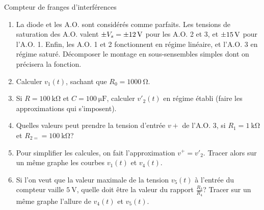 \documentclass[french, a4paper, 11pt]{article}
\begin{document}
\begin{cadre}{Compteur de franges d'interférences}
  \begin{enumerate}[label=\upshape\alph*)]
    \item La diode et les A.O. sont considérés comme parfaits. Les tensions de saturation des A.O. valent \(\pm V_{s} = \SI{\pm 12}{\volt}\) pour les A.O. 2 et 3, et \(\SI{\pm 15}{\volt}\) pour l'A.O. 1. Enfin, les A.O. 1 et 2 fonctionnent en régime linéaire, et l'A.O. 3 en régime saturé. Décomposer le montage en sous-sensembles simples dont on précisera la fonction.
    \item Calculer \(v_{1}(t)\), sachant que \(R_{0}=\SI{1000}{\ohm}\).
    \item Si \(R=\SI{100}{\kilo\ohm}\) et \(C=\SI{100}{\micro\farad}\), calculer \(v'_{2}(t)\) en régime établi (faire les approximations qui s'imposent).
    \item Quelles valeurs peut prendre la tension d'entrée \(v+\) de l'A.O. 3, si \(R_{1}=\SI{1}{\kilo\ohm}\) et \(R_{2=}=\SI{100}{\kilo\ohm}\)?
    \item Pour simplifier les calcules, on fait l'approximation \(v^{+}=v'_{2}\). Tracer alors sur un même graphe les courbes \(v_{1}(t)\) et \(v_{4}(t)\).
    \item Si l'on veut que la valeur maximale de la tension \(v_{5}(t)\) à l'entrée du compteur vaille \(\SI{5}{\volt}\), quelle doit être la valeur du rapport \(\frac{R_{3}}{R_{4}}\)? Tracer sur un même graphe l'allure de \(v_{4}(t)\) et \(v_{5}(t)\).
  \end{enumerate}
\end{cadre}
\end{document}
